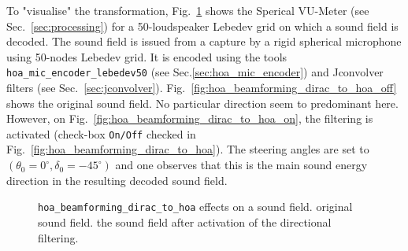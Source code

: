 \documentclass[10pt,a4paper]{article}
\begin{document}
To "visualise" the transformation, Fig.~\ref{fig:hoa_beamforming_dirac_to_hoa2} shows the Sperical VU-Meter (see Sec.~\ref{sec:processing}) for a 50-loudspeaker Lebedev grid on which a sound field is decoded. The sound field is issued from a capture by a rigid spherical microphone using 50-nodes Lebedev grid. It is encoded using the tools \lstinline'hoa_mic_encoder_lebedev50' (see Sec.\ref{sec:hoa_mic_encoder}) and Jconvolver filters (see Sec.~\ref{sec:jconvolver}). Fig.~\ref{fig:hoa_beamforming_dirac_to_hoa_off} shows the original sound field. No particular direction seem to predominant here. However, on Fig.~\ref{fig:hoa_beamforming_dirac_to_hoa_on}, the filtering is activated (check-box \lstinline'On/Off' checked in Fig.~\ref{fig:hoa_beamforming_dirac_to_hoa}). The steering angles are set to $(\theta_0=0^\circ,\delta_0=-45^\circ)$ and one observes that this is the main sound energy direction in the resulting decoded sound field.
\begin{figure}
\centering
{}
\caption{\lstinline'hoa_beamforming_dirac_to_hoa' effects on a sound field.  original sound field.
 the sound field after activation of the directional filtering.}
\label{fig:hoa_beamforming_dirac_to_hoa2}
\end{figure}
\clearpage
\pagebreak
\end{document}
